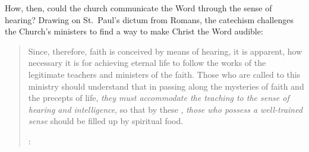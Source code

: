 How, then, could the church communicate the Word through the sense of hearing?
Drawing on St.\ Paul's dictum from Romans, the catechism challenges the Church's ministers to find a way to make Christ the Word audible:
\begin{quote}
  Since, therefore, faith is conceived by means of hearing, it is apparent, how necessary it is for achieving eternal life to follow the works of the legitimate teachers and ministers of the faith. \Dots{}
  Those who are called to this ministry should understand that in passing along the mysteries of faith and the precepts of life, \emph{they must accommodate the teaching to the sense of hearing and intelligence}, so that by these , \emph{those who possess a well-trained sense} should be filled up by spiritual food.%
  \begin{Footnote}
    \Autocite[2, 8--9 (emphasis added)]{Catholic:Catechismus1614}: 
  \end{Footnote}
\end{quote}

